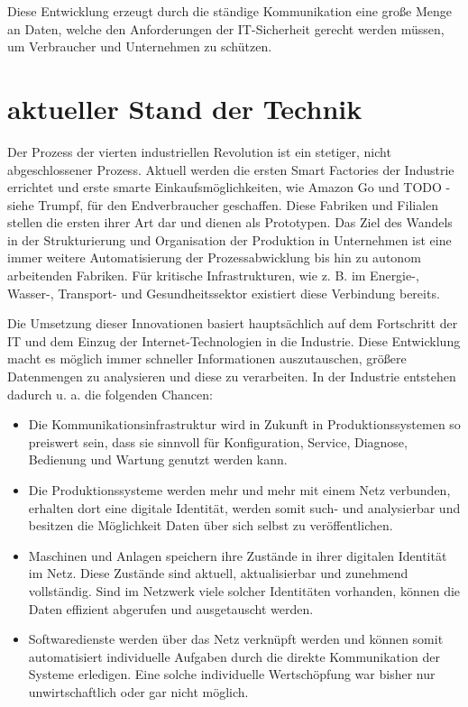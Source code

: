 \clearpage

Diese Entwicklung erzeugt durch die ständige Kommunikation eine große Menge an Daten, welche den Anforderungen der IT-Sicherheit gerecht werden müssen, um Verbraucher und Unternehmen zu schützen.

\section{aktueller Stand der Technik}
Der Prozess der vierten industriellen Revolution ist ein stetiger, nicht abgeschlossener Prozess. Aktuell werden die ersten Smart Factories der Industrie errichtet und erste smarte Einkaufsmöglichkeiten, wie Amazon Go und TODO - siehe Trumpf, für den Endverbraucher geschaffen. Diese Fabriken und Filialen stellen die ersten ihrer Art dar und dienen als Prototypen. Das Ziel des Wandels in der Strukturierung und Organisation der Produktion in Unternehmen ist eine immer weitere Automatisierung der Prozessabwicklung bis hin zu autonom arbeitenden Fabriken. Für kritische Infrastrukturen, wie z. B. im Energie-, Wasser-, Transport- und Gesundheitssektor existiert diese Verbindung bereits.

Die Umsetzung dieser Innovationen basiert hauptsächlich auf dem Fortschritt der \ac{IT} und dem Einzug der Internet-Technologien in die Industrie. Diese Entwicklung macht es möglich immer schneller Informationen auszutauschen, größere Datenmengen zu analysieren und diese zu verarbeiten. In der Industrie entstehen dadurch u. a. die folgenden Chancen:

\begin{itemize}
  \item Die Kommunikationsinfrastruktur wird in Zukunft in Produktionssystemen so preiswert sein, dass sie sinnvoll für Konfiguration, Service, Diagnose, Bedienung und Wartung genutzt werden kann.
  \item Die Produktionssysteme werden mehr und mehr mit einem Netz verbunden, erhalten dort eine digitale Identität, werden somit such- und analysierbar und besitzen die Möglichkeit Daten über sich selbst zu veröffentlichen. 
  \item Maschinen und Anlagen speichern ihre Zustände in ihrer digitalen Identität im Netz. Diese Zustände sind aktuell, aktualisierbar und zunehmend vollständig. Sind im Netzwerk viele solcher Identitäten vorhanden, können die Daten effizient abgerufen und ausgetauscht werden.
  \item Softwaredienste werden über das Netz verknüpft werden und können somit automatisiert individuelle Aufgaben durch die direkte Kommunikation der Systeme erledigen. Eine solche individuelle Wertschöpfung war bisher nur unwirtschaftlich oder gar nicht möglich.
\end{itemize}


